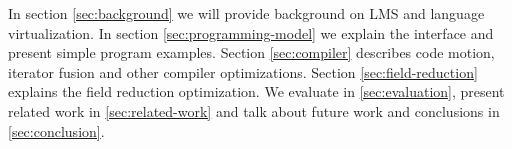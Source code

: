 In section \ref{sec:background} we will provide background on LMS and language virtualization. In section \ref{sec:programming-model} we explain the interface and present simple program examples. Section \ref{sec:compiler} describes code motion, iterator fusion and other compiler optimizations. Section \ref{sec:field-reduction} explains the field reduction optimization. We evaluate \tool in \ref{sec:evaluation}, present related work in \ref{sec:related-work} and talk about future work and conclusions in \ref{sec:conclusion}.